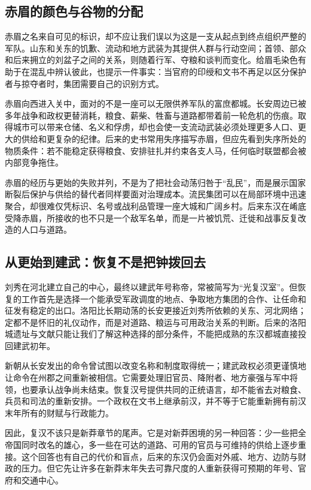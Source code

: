 \subsection{赤眉的颜色与谷物的分配}

赤眉之名来自可见的标识，却不应让我们误以为这是一支从起点到终点组织严整的军队。山东和关东的饥歉、流动和地方武装为其提供人群与行动空间；首领、部众和后来拥立的刘盆子之间的关系，则随着行军、夺粮和谈判而变化。给眉毛染色有助于在混乱中辨认彼此，也提示一件事实：当官府的印绶和文书不再足以区分保护者与掠夺者时，集团需要自己的识别方式。

赤眉向西进入关中，面对的不是一座可以无限供养军队的富庶都城。长安周边已被多年战争和政权更替消耗，粮食、薪柴、牲畜与道路都带着前一轮危机的伤痕。取得城市可以带来仓储、名义和俘虏，却也会使一支流动武装必须处理更多人口、更大的供给和更复杂的纪律。后来的史书常用失序描写赤眉，但应先看到失序所处的物质条件：若不能稳定获得粮食、安排驻扎并约束各支人马，任何临时联盟都会被内部竞争拖住。

赤眉的经历与更始的失败并列，不是为了把社会动荡归咎于“乱民”，而是展示国家断裂后保护与供给的替代者同样要面对治理成本。流民集团可以在局部环境中迅速聚合，却很难仅凭标识、名号或战利品管理一座大城和广阔乡村。后来东汉在崤底受降赤眉，所接收的也不只是一个敌军名单，而是一片被饥荒、迁徙和战事反复改造的人口与道路。

\subsection{从更始到建武：恢复不是把钟拨回去}

刘秀在河北建立自己的中心，最终以建武年号称帝，常被简写为“光复汉室”。但恢复的工作首先是选择一个能承受军政调度的地点、争取地方集团的合作、让任命和征发有稳定的出口。洛阳比长期动荡的长安更接近刘秀所依赖的关东、河北网络；定都不是怀旧的礼仪动作，而是对道路、粮运与可用政治关系的判断。后来的洛阳城遗址与文献只能让我们了解这种选择的部分条件，不能把成熟的东汉都城直接投回建武初年。

新朝从长安发出的命令曾试图以改变名称和制度取得统一；建武政权必须更谨慎地让命令在州郡之间重新被相信。它需要处理旧官员、降附者、地方豪强与军中将领，也要承认战争尚未结束。恢复汉号提供共同的正统语言，却不能省去对粮食、兵员和司法的重新安排。一个政权在文书上继承前汉，并不等于它能重新拥有前汉末年所有的财赋与行政能力。

因此，复汉不该只是新莽章节的尾声。它是对新莽困境的另一种回答：少一些把全帝国同时改名的雄心，多一些在可达的道路、可用的官员与可维持的供给上逐步重接。这个回答也有自己的代价和盲点，后来的东汉仍会面对外戚、地方、边防与财政的压力。但它先让许多在新莽末年失去可靠尺度的人重新获得可预期的年号、官府和交通中心。

